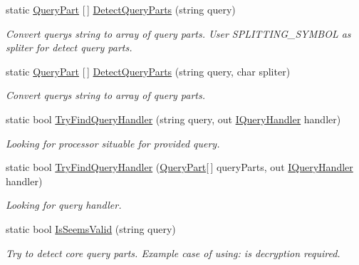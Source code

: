 \begin{DoxyCompactItemize}
static \mbox{\hyperlink{struct_uniform_queries_1_1_query_part}{Query\+Part}} \mbox{[}$\,$\mbox{]} \mbox{\hyperlink{class_uniform_queries_1_1_a_p_i_a013ca0eff0e67d7f30a6be289312b859}{Detect\+Query\+Parts}} (string query)
\begin{DoxyCompactList}\small\item\em Convert query\textquotesingle{}s string to array of query parts. User S\+P\+L\+I\+T\+T\+I\+N\+G\+\_\+\+S\+Y\+M\+B\+OL as spliter for detect query parts. \end{DoxyCompactList}\item 
static \mbox{\hyperlink{struct_uniform_queries_1_1_query_part}{Query\+Part}} \mbox{[}$\,$\mbox{]} \mbox{\hyperlink{class_uniform_queries_1_1_a_p_i_ab5875a3346878ba21ab331ba07889e92}{Detect\+Query\+Parts}} (string query, char spliter)
\begin{DoxyCompactList}\small\item\em Convert query\textquotesingle{}s string to array of query parts. \end{DoxyCompactList}\item 
static bool \mbox{\hyperlink{class_uniform_queries_1_1_a_p_i_a6b5e9796e2ed61c94fc49df8e6fec0d9}{Try\+Find\+Query\+Handler}} (string query, out \mbox{\hyperlink{interface_uniform_queries_1_1_executable_1_1_i_query_handler}{I\+Query\+Handler}} handler)
\begin{DoxyCompactList}\small\item\em Looking for processor situable for provided query. \end{DoxyCompactList}\item 
static bool \mbox{\hyperlink{class_uniform_queries_1_1_a_p_i_a0b929a433be6dc51a05718bd682317f9}{Try\+Find\+Query\+Handler}} (\mbox{\hyperlink{struct_uniform_queries_1_1_query_part}{Query\+Part}}\mbox{[}$\,$\mbox{]} query\+Parts, out \mbox{\hyperlink{interface_uniform_queries_1_1_executable_1_1_i_query_handler}{I\+Query\+Handler}} handler)
\begin{DoxyCompactList}\small\item\em Looking for query handler. \end{DoxyCompactList}\item 
static bool \mbox{\hyperlink{class_uniform_queries_1_1_a_p_i_a76acc6d6941a7a30d0ed87f69eab3434}{Is\+Seems\+Valid}} (string query)
\begin{DoxyCompactList}\small\item\em Try to detect core query parts. Example case of using\+: is decryption required. \end{DoxyCompactList}\end{DoxyCompactItemize}
